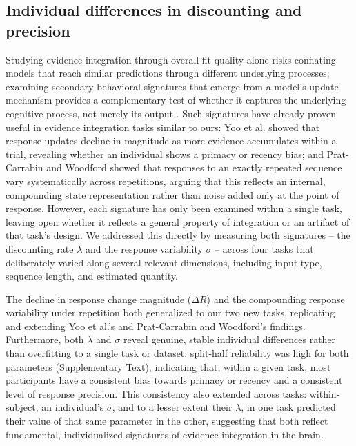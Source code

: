 \documentclass[12pt]{article}
\begin{document}
\subsection{Individual differences in discounting and precision}
Studying evidence integration through overall fit quality alone risks conflating models that reach similar predictions through different underlying processes; examining secondary behavioral signatures that emerge from a model's update mechanism provides a complementary test of whether it captures the underlying cognitive process, not merely its output \cite{palminteri2017falsification, wilson2019ten}. Such signatures have already proven useful in evidence integration tasks similar to ours: Yoo et al. \cite{yoo2025people} showed that response updates decline in magnitude as more evidence accumulates within a trial, revealing whether an individual shows a primacy or recency bias; and Prat-Carrabin and Woodford \cite{prat2024imprecise} showed that responses to an exactly repeated sequence vary systematically across repetitions, arguing that this reflects an internal, compounding state representation rather than noise added only at the point of response. However, each signature has only been examined within a single task, leaving open whether it reflects a general property of integration or an artifact of that task's design. We addressed this directly by measuring both signatures -- the discounting rate $\lambda$ and the response variability $\sigma$ -- across four tasks that deliberately varied along several relevant dimensions, including input type, sequence length, and estimated quantity.

The decline in response change magnitude ($\Delta R$) and the compounding response variability under repetition both generalized to our two new tasks, replicating and extending Yoo et al.'s \cite{yoo2025people} and Prat-Carrabin and Woodford's \cite{prat2024imprecise} findings. Furthermore, both $\lambda$ and $\sigma$ reveal genuine, stable individual differences rather than overfitting to a single task or dataset: split-half reliability was high for both parameters (Supplementary Text), indicating that, within a given task, most participants have a consistent bias towards primacy or recency and a consistent level of response precision. This consistency also extended across tasks: within-subject, an individual's $\sigma$, and to a lesser extent their $\lambda$, in one task predicted their value of that same parameter in the other, suggesting that both reflect fundamental, individualized signatures of evidence integration in the brain.
\end{document}
